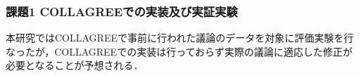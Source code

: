 \subsubsection*{課題1 COLLAGREEでの実装及び実証実験}
本研究ではCOLLAGREEで事前に行われた議論のデータを対象に評価実験を行なったが，COLLAGREEでの実装は行っておらず実際の議論に適応した修正が必要となることが予想される．

